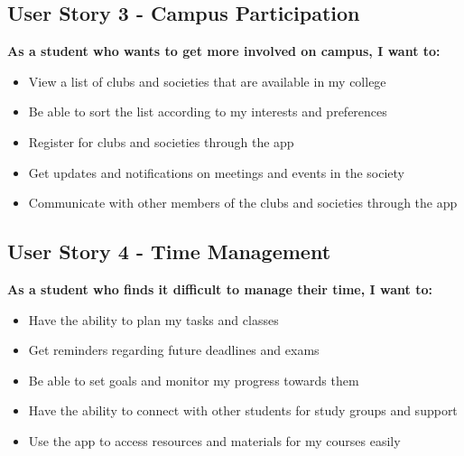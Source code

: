 \subsection*{User Story 3 - Campus Participation}
\textbf{As a student who wants to get more involved on campus, I want to:}
\begin{itemize}
    \item View a list of clubs and societies that are available in my college
    \item Be able to sort the list according to my interests and preferences
    \item Register for clubs and societies through the app
    \item Get updates and notifications on meetings and events in the society
    \item Communicate with other members of the clubs and societies through the app
\end{itemize}

\subsection*{User Story 4 - Time Management}
\textbf{As a student who finds it difficult to manage their time, I want to:}
\begin{itemize}
    \item Have the ability to plan my tasks and classes
    \item Get reminders regarding future deadlines and exams
    \item Be able to set goals and monitor my progress towards them
    \item Have the ability to connect with other students for study groups and support
    \item Use the app to access resources and materials for my courses easily
\end{itemize}

